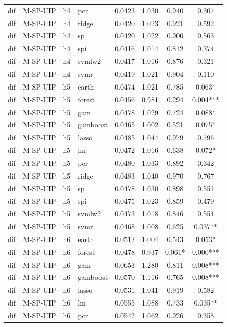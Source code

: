 \begin{ThreePartTable}
\begin{longtable}[t]{llclcccc}
dif & M-SP-UIP & h4 & pcr & 0.0423 & 1.030 & 0.940 & 0.307\\
dif & M-SP-UIP & h4 & ridge & 0.0420 & 1.023 & 0.921 & 0.592\\
dif & M-SP-UIP & h4 & sp & 0.0420 & 1.022 & 0.900 & 0.563\\
dif & M-SP-UIP & h4 & spi & 0.0416 & 1.014 & 0.812 & 0.374\\
dif & M-SP-UIP & h4 & svmlw2 & 0.0417 & 1.016 & 0.876 & 0.321\\
dif & M-SP-UIP & h4 & svmr & 0.0419 & 1.021 & 0.904 & 0.110\\
\addlinespace
dif & M-SP-UIP & h5 & earth & 0.0474 & 1.021 & 0.785 & 0.063*\\
dif & M-SP-UIP & h5 & forest & 0.0456 & 0.981 & 0.294 & 0.004***\\
dif & M-SP-UIP & h5 & gam & 0.0478 & 1.029 & 0.724 & 0.088*\\
dif & M-SP-UIP & h5 & gamboost & 0.0465 & 1.002 & 0.521 & 0.075*\\
dif & M-SP-UIP & h5 & lasso & 0.0485 & 1.044 & 0.979 & 0.796\\
dif & M-SP-UIP & h5 & lm & 0.0472 & 1.016 & 0.638 & 0.072*\\
dif & M-SP-UIP & h5 & pcr & 0.0480 & 1.033 & 0.892 & 0.342\\
dif & M-SP-UIP & h5 & ridge & 0.0483 & 1.040 & 0.970 & 0.767\\
dif & M-SP-UIP & h5 & sp & 0.0478 & 1.030 & 0.898 & 0.551\\
dif & M-SP-UIP & h5 & spi & 0.0475 & 1.023 & 0.859 & 0.479\\
dif & M-SP-UIP & h5 & svmlw2 & 0.0473 & 1.018 & 0.846 & 0.554\\
dif & M-SP-UIP & h5 & svmr & 0.0468 & 1.008 & 0.625 & 0.037**\\
\addlinespace
dif & M-SP-UIP & h6 & earth & 0.0512 & 1.004 & 0.543 & 0.053*\\
dif & M-SP-UIP & h6 & forest & 0.0478 & 0.937 & 0.061* & 0.000***\\
dif & M-SP-UIP & h6 & gam & 0.0653 & 1.280 & 0.811 & 0.008***\\
dif & M-SP-UIP & h6 & gamboost & 0.0570 & 1.116 & 0.765 & 0.008***\\
dif & M-SP-UIP & h6 & lasso & 0.0531 & 1.041 & 0.919 & 0.582\\
dif & M-SP-UIP & h6 & lm & 0.0555 & 1.088 & 0.733 & 0.035**\\
dif & M-SP-UIP & h6 & pcr & 0.0542 & 1.062 & 0.926 & 0.358\\

\end{longtable}
\end{ThreePartTable}
